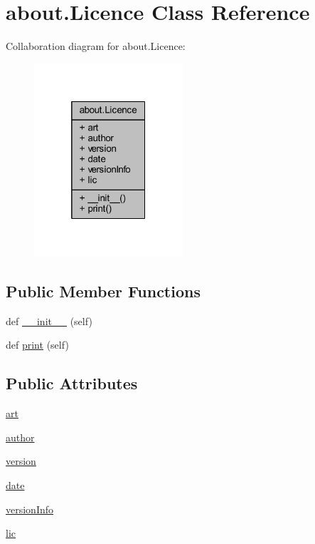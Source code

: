 \hypertarget{classabout_1_1_licence}{}\section{about.\+Licence Class Reference}
\label{classabout_1_1_licence}


Collaboration diagram for about.\+Licence\+:
\nopagebreak
\begin{figure}[H]
\begin{center}
\leavevmode
\includegraphics[width=157pt]{classabout_1_1_licence__coll__graph}
\end{center}
\end{figure}
\subsection*{Public Member Functions}
\begin{DoxyCompactItemize}
\item 
def \mbox{\hyperlink{classabout_1_1_licence_a6c11624281f8710f2c1eb90c33285714}{\+\_\+\+\_\+init\+\_\+\+\_\+}} (self)
\item 
def \mbox{\hyperlink{classabout_1_1_licence_a9e1e0f8b2a9fb1c4c34f0fac0cfd2b94}{print}} (self)
\end{DoxyCompactItemize}
\subsection*{Public Attributes}
\begin{DoxyCompactItemize}
\item 
\mbox{\hyperlink{classabout_1_1_licence_a86ed9b8474a45be978024c106a690919}{art}}
\item 
\mbox{\hyperlink{classabout_1_1_licence_ac292e3400b704815fe91a2761f3ab2c1}{author}}
\item 
\mbox{\hyperlink{classabout_1_1_licence_a54d0ec766d3b53ff919f5e7349fe27c1}{version}}
\item 
\mbox{\hyperlink{classabout_1_1_licence_a84e5350951df766d2e12760ac1016fcf}{date}}
\item 
\mbox{\hyperlink{classabout_1_1_licence_a1591338bb07744db00318cfb2279257b}{version\+Info}}
\item 
\mbox{\hyperlink{classabout_1_1_licence_a4b8863c697fe25a9fec148269f98f10f}{lic}}
\end{DoxyCompactItemize}


